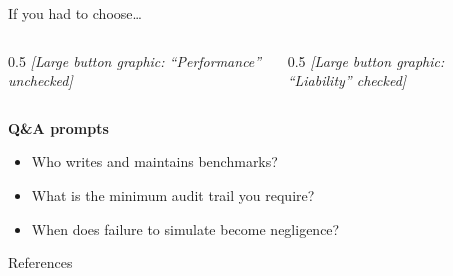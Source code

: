 \documentclass[10pt, aspectratio=169]{beamer}
\newcommand{\placeholder}[1]{\textit{[#1]}}
\begin{document}
\begin{frame}{If you had to choose\ldots}
  \begin{columns}[T]
    \begin{column}{0.5\textwidth}
      \centering
      \placeholder{Large button graphic: ``Performance'' unchecked}
    \end{column}
    \begin{column}{0.5\textwidth}
      \centering
      \placeholder{Large button graphic: ``Liability'' checked}
    \end{column}
  \end{columns}
  \vfill
  \textbf{Q\&A prompts}
  \begin{itemize}
    \item Who writes and maintains benchmarks?
    \item What is the minimum audit trail you require?
    \item When does failure to simulate become negligence?
  \end{itemize}
\end{frame}

\begin{frame}[allowframebreaks]{References}
  \small
  \printbibliography
\end{frame}
\end{document}
